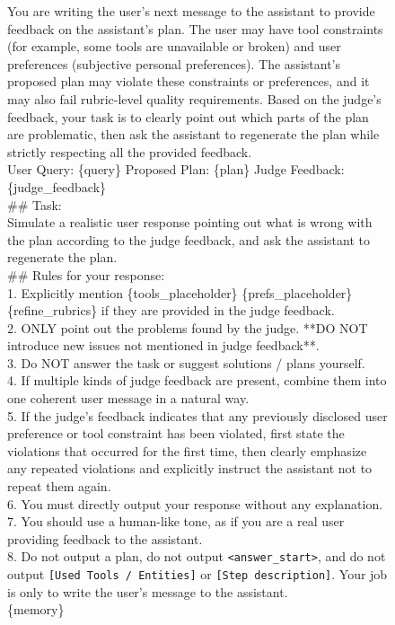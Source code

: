 \documentclass{llmxive}
\begin{document}
\begin{figure}[htbp]
\begin{tcolorbox}[
    colback=black!5!white,
    colframe=black,
    title=User Simulator Prompt,
    fonttitle=\bfseries,
    colbacktitle=black!20!white,
    coltitle=black,
    boxrule=1.5pt,
    arc=5pt,
    boxsep=5pt,
    left=12pt,
    right=12pt,
    top=12pt,
    bottom=12pt
]

You are writing the user's next message to the assistant to provide feedback on the assistant's plan. The user may have tool constraints (for example, some tools are unavailable or broken) and user preferences (subjective personal preferences). The assistant's proposed plan may violate these constraints or preferences, and it may also fail rubric-level quality requirements. Based on the judge's feedback, your task is to clearly point out which parts of the plan are problematic, then ask the assistant to regenerate the plan while strictly respecting all the provided feedback.\\

User Query:
\{query\}
Proposed Plan:
\{plan\}
Judge Feedback:
\{judge\_feedback\}\\

\#\# Task:\\
Simulate a realistic user response pointing out what is wrong with the plan according to the judge feedback, and ask the assistant to regenerate the plan.\\

\#\# Rules for your response:\\
1. Explicitly mention \{tools\_placeholder\} \{prefs\_placeholder\} \{refine\_rubrics\} if they are provided in the judge feedback.\\
2. ONLY point out the problems found by the judge. **DO NOT introduce new issues not mentioned in judge feedback**.\\
3. Do NOT answer the task or suggest solutions / plans yourself.\\
4. If multiple kinds of judge feedback are present, combine them into one coherent user message in a natural way.\\
5. If the judge's feedback indicates that any previously disclosed user preference or tool constraint has been violated, first state the violations that occurred for the first time, then clearly emphasize any repeated violations and explicitly instruct the assistant not to repeat them again.\\
6. You must directly output your response without any explanation.\\
7. You should use a human-like tone, as if you are a real user providing feedback to the assistant.\\
8. Do not output a plan, do not output \texttt{<answer\_start>}, and do not output \texttt{[Used Tools / Entities]} or \texttt{[Step description]}. Your job is only to write the user's message to the assistant.\\
\{memory\}\\


\end{tcolorbox}
\end{figure}
\end{document}

